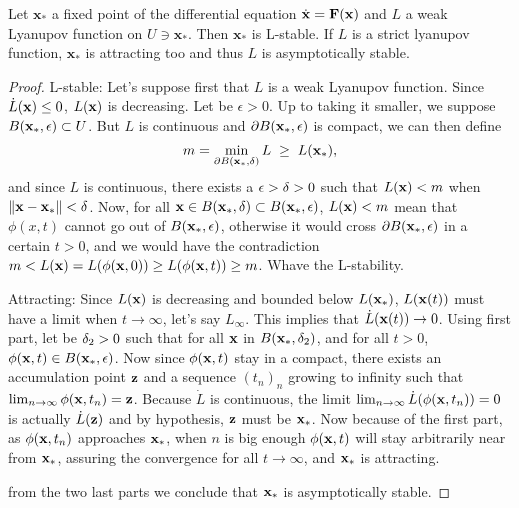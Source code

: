 \begin{theoreme} \label{th:Lianupov}
Let $\mathbf{x}_*$ a fixed point of the differential equation $\dot{\mathbf{x}} = \mathbf{F}(\mathbf{x})$ and $L$ a weak Lyanupov function on $U\ni\mathbf{x}_*$. Then $\mathbf{x}_*$ is L-stable. If $L$ is a strict lyanupov function, $\mathbf{x}_*$ is attracting too and thus $L$ is asymptotically stable.
\end{theoreme}
\begin{proof}
L-stable: Let's suppose first that $L$ is a weak Lyanupov function. Since $\dot{L}(\mathbf{x}) \leq 0$, $L(\mathbf{x})$ is decreasing. Let be $\epsilon>0$. Up to taking it smaller, we suppose $B(\mathbf{x}_*,\epsilon) \subset U$. But $L$ is continuous and $\partial B(\mathbf{x}_*,\epsilon)$ is compact, we can then define
\[m=\min_{\partial B(\mathbf{x}_*,\delta)}{L} \; \geq \; L(\mathbf{x}_*),\]
and since $L$ is continuous, there exists a $\epsilon>\delta>0$ such that $L(\mathbf{x})<m$ when $\|\mathbf{x}-\mathbf{x}_*\|<\delta$. Now, for all $\mathbf{x}\in B(\mathbf{x}_*,\delta) \subset B(\mathbf{x}_*,\epsilon)$, $L(\mathbf{x})<m$ mean that $\phi(x,t)$ cannot go out of $B(\mathbf{x}_*,\epsilon)$, otherwise it would cross $\partial B(\mathbf{x}_*,\epsilon)$ in a certain $t>0$, and  we would have the contradiction $m<L(\mathbf{x})=L(\phi(\mathbf{x},0)) \geq L(\phi(\mathbf{x},t)) \geq m$. Whave the L-stability.

Attracting: Since $L(\mathbf{x})$ is decreasing and bounded below $L(\mathbf{x}_*)$, $L(\mathbf{x}(t))$ must have a limit when $t\to\infty$, let's say $L_{\infty}$. This implies that $\dot{L}(\mathbf{x}(t)) \to 0$. Using first part, let be $\delta_2>0$ such that for all $\mathbf{x}$ in $B(\mathbf{x}_*,\delta_2)$, and for all $t>0$, $\phi(\mathbf{x},t) \in B(\mathbf{x}_*,\epsilon)$. Now since $\phi(\mathbf{x},t)$ stay in a compact, there exists an accumulation point $\mathbf{z}$ and a sequence $(t_n)_n$ growing to infinity such that $\lim_{n\to\infty} \phi(\mathbf{x},t_n) = \mathbf{z}$. Because $\dot{L}$ is continuous, the limit $\lim_{n\to\infty} \dot{L}(\phi(\mathbf{x},t_n)) =0$ is actually $\dot{L}(\mathbf{z})$ and by hypothesis, $\mathbf{z}$ must be $\mathbf{x}_*$. Now because of the first part, as $\phi(\mathbf{x},t_n)$ approaches $\mathbf{x}_*$, when $n$ is big enough $\phi(\mathbf{x},t)$ will stay arbitrarily near from $\mathbf{x}_*$, assuring the convergence for all $t\to\infty$, and $\mathbf{x}_*$ is attracting.

from the two last parts we conclude that $\mathbf{x}_*$ is asymptotically stable.
\end{proof}

